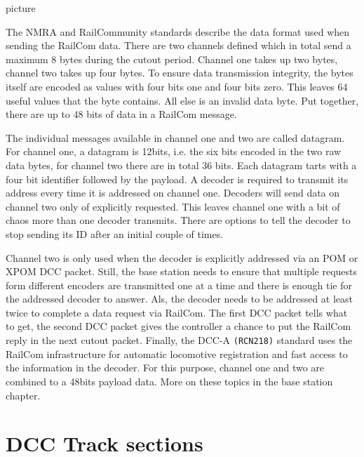 picture 

\begin{figure}[h]
    \centering
\end{figure}

The NMRA and RailCommunity standards describe the data format used when sending the RailCom data. There are two channels defined which in total send a maximum 8 bytes during the cutout period. Channel one takes up two bytes, channel two takes up four bytes. To ensure data transmission integrity, the bytes itself are encoded as values with four bits one and four bits zero. This leaves 64 useful values that the byte contains. All else is an invalid data byte. Put together, there are up to 48 bits of data in a RailCom message.

The individual messages available in channel one and two are called datagram. For channel one, a datagram is 12bits, i.e. the six bits encoded in the two raw data bytes, for channel two there are in total 36 bits. Each datagram tarts with a four bit identifier followed by the payload. A decoder is required to transmit its address every time it is addressed on channel one. Decoders will send data on channel two only of explicitly requested. This leaves channel one with a bit of chaos more than one decoder transmits. There are options to tell the decoder to stop sending its ID after an initial couple of times.

Channel two is only used when the decoder is explicitly addressed via an POM or XPOM DCC packet. Still, the base station needs to ensure that multiple requests form different encoders are transmitted one at a time and there is enough tie for the addressed decoder to answer. Als, the decoder needs to be addressed at least twice to complete a data request via RailCom. The first DCC packet tells what to get, the second DCC packet gives the controller a chance to put the RailCom reply in the next cutout packet. Finally, the DCC-A \texttt{(RCN218)} standard uses the RailCom infrastructure for automatic locomotive registration and fast access to the information in the decoder. For this purpose, channel one and two are combined to a 48bits payload data. More on these topics in the base station chapter.

\section{DCC Track sections}

